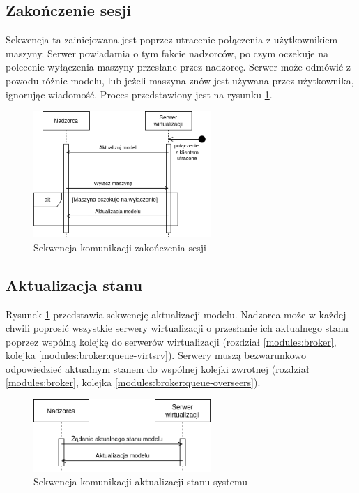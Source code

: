 \documentclass[../opis-rozwiazania.tex]{subfiles}
\begin{document}
\subsection{Zakończenie sesji}

Sekwencja ta zainicjowana jest poprzez utracenie połączenia z użytkownikiem maszyny.
Serwer powiadamia o tym fakcie nadzorców, po czym oczekuje na polecenie wyłączenia maszyny przesłane przez nadzorcę. Serwer może odmówić z powodu różnic modelu, lub jeżeli maszyna znów jest używana przez użytkownika, ignorując wiadomość. Proces przedstawiony jest na rysunku \ref{figure:diagrams:sequence_diagrams:konczenie_sesji}.

\begin{figure}[ht!]
  \centering
  \includegraphics[width=0.6\textwidth]{../diagrams/sequence_diagrams/konczenie_sesji.png}
  \caption{Sekwencja komunikacji zakończenia sesji}
  \label{figure:diagrams:sequence_diagrams:konczenie_sesji}
\end{figure}

\subsection{Aktualizacja stanu}

Rysunek \ref{figure:diagrams:sequence_diagrams:konczenie_sesji} przedstawia sekwencję aktualizacji modelu. Nadzorca może w każdej chwili poprosić wszystkie serwery wirtualizacji
o przesłanie ich aktualnego stanu poprzez wspólną kolejkę do serwerów wirtualizacji (rozdział \ref{modules:broker}, kolejka \ref{modules:broker:queue-virtsrv}).
Serwery muszą bezwarunkowo odpowiedzieć aktualnym stanem do wspólnej kolejki zwrotnej (rozdział \ref{modules:broker}, kolejka \ref{modules:broker:queue-overseers}).

\begin{figure}[ht!]
  \centering
  \includegraphics[width=0.6\textwidth]{../diagrams/sequence_diagrams/aktualizacja_stanu.png}
  \caption{Sekwencja komunikacji aktualizacji stanu systemu}
  \label{figure:diagrams:sequence_diagrams:aktualizacja_stanu}
\end{figure}
\end{document}
